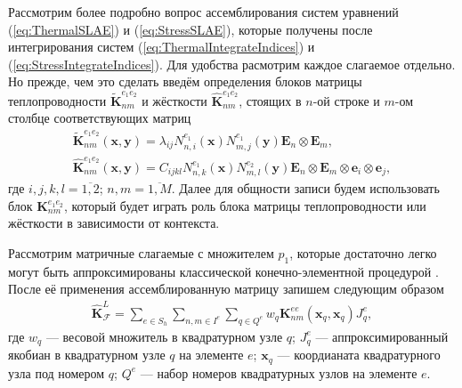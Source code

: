 Рассмотрим более подробно вопрос ассемблирования систем уравнений (\ref{eq:ThermalSLAE}) и (\ref{eq:StressSLAE}), которые получены после интегрирования систем (\ref{eq:ThermalIntegrateIndices}) и (\ref{eq:StressIntegrateIndices}). Для удобства расмотрим каждое слагаемое отдельно. Но прежде, чем это сделать введём определения блоков матрицы теплопроводности $\widetilde{\textbf{K}}_{nm}^{e_1 e_2}$ и жёсткости $\widehat{\textbf{K}}_{nm}^{e_1 e_2}$, стоящих в $n$-ой строке и $m$-ом столбце соответствующих матриц
\begin{gather}
	\label{eq:ThermalBlock}
	\widetilde{\textbf{K}}_{nm}^{e_1 e_2} (\boldsymbol{x}, \boldsymbol{y}) =
	\lambda_{ij} N_{n,i}^{e_1} (\boldsymbol{x}) N_{m,j}^{e_1} (\boldsymbol{y})
	\boldsymbol{E}_n \otimes \boldsymbol{E}_m, \\
	\label{eq:StressBlock}
	\widehat{\textbf{K}}_{nm}^{e_1 e_2} (\boldsymbol{x}, \boldsymbol{y}) = 
	C_{ijkl} N_{n,k}^{e_1} (\boldsymbol{x}) N_{m,l}^{e_2} (\boldsymbol{y}) \boldsymbol{E}_n \otimes \boldsymbol{E}_m \otimes \boldsymbol{e}_i \otimes \boldsymbol{e}_j,
\end{gather}
где $i,j,k,l = \overline{1,2}$; $n,m = \overline{1,M}$. Далее для общности записи будем использовать блок $\textbf{K}_{nm}^{e_1 e_2}$, который будет играть роль блока матрицы теплопроводности или жёсткости в зависимости от контекста.

Рассмотрим матричные слагаемые с множителем $p_1$, которые достаточно легко могут быть аппроксимированы классической конечно-элементной процедурой \cite{Zienkiewicz, Bathe}. После её применения ассемблированную матрицу запишем следующим образом
\begin{gather}
	\label{eq:LocalMatrix}
	\widehat{\textbf{K}}^L_{\mathcal{F}} =
	\sum\limits_{e \in S_h}
	\sum\limits_{n,m \in I^e}
	\sum\limits_{q \in Q^e}
	w_q \textbf{K}^{ee}_{nm} (\boldsymbol{x}_q, \boldsymbol{x}_q) J_q^e,
\end{gather}
где $w_q$ --- весовой множитель в квадратурном узле $q$;
$J_q^e$ --- аппроксимированный якобиан в квадратурном узле $q$ на элементе $e$;
$\boldsymbol{x}_q$ --- коордианата квадратурного узла под номером $q$;
$Q^e$ --- набор номеров квадратурных узлов на элементе $e$.


